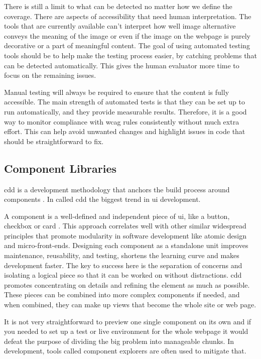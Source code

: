 \documentclass{master_thesis}
\begin{document}
There is still a limit to what can be detected no matter how we define the coverage. There are aspects of accessibility that need human interpretation. The tools that are currently available can't interpret how well image alternative conveys the meaning of the image or even if the image on the webpage is purely decorative or a part of meaningful content. The goal of using automated testing tools should be to help make the testing process easier, by catching problems that can be detected automatically. This gives the human evaluator more time to focus on the remaining issues.

Manual testing will always be required to ensure that the content is fully accessible. The main strength of automated tests is that they can be set up to run automatically, and they provide measurable results. Therefore, it is a good way to monitor compliance with \ac{wcag} rules consistently without much extra effort. This can help avoid unwanted changes and highlight issues in code that should be straightforward to fix.

\subsection{Component Libraries}


\ac{cdd} is a development methodology that anchors the build process around components \citep{Coleman2017}. In \citeyear{Coleman2017} \citeauthor{Coleman2017} called \ac{cdd} the biggest trend in \ac{ui} development.

A component is a well-defined and independent piece of \ac{ui}, like a button, checkbox or card \citep{Ella2019}. This approach correlates well with other similar widespread principles that promote modularity in software development like atomic design and micro-front-ends. Designing each component as a standalone unit improves maintenance, reusability, and testing, shortens the learning curve and makes development faster. The key to success here is the separation of concerns and isolating a logical piece so that it can be worked on without distractions. \ac{cdd} promotes concentrating on details and refining the element as much as possible. These pieces can be combined into more complex components if needed, and when combined, they can make up views that become the whole site or web page.

It is not very straightforward to preview one single component on its own and if you needed to set up a test or live environment for the whole webpage it would defeat the purpose of dividing the big problem into manageable chunks. In development, tools called component explorers are often used to mitigate that.
\end{document}
